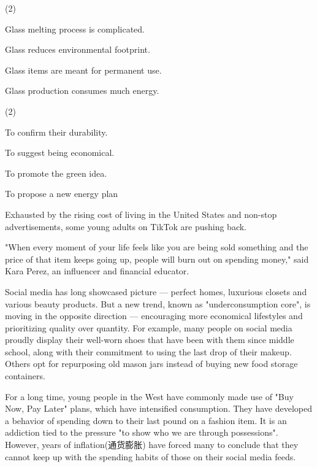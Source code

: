 \documentclass{英语试卷}
\begin{document}
\begin{choices}(2)
  \item Glass melting process is complicated.
  \item Glass reduces environmental footprint.
  \item Glass items are meant for permanent use.
  \item Glass production consumes much energy.
\end{choices}
\begin{choices}(2)
  \item To confirm their durability.
  \item To suggest being economical.
  \item To promote the green idea.
  \item To propose a new energy plan
\end{choices}
\par Exhausted by the rising cost of living in the United States and non-stop advertisements, some young adults on TikTok are pushing back.\par
\par "When every moment of your life feels like you are being sold something and the price of that item keeps going up, people will burn out on spending money," said Kara Perez, an influencer and financial educator.\par
\par Social media has long showcased picture — perfect homes, luxurious closets and various beauty products. But a new trend, known as "underconsumption core", is moving in the opposite direction — encouraging more economical lifestyles and prioritizing quality over quantity. For example, many people on social media proudly display their well-worn shoes that have been with them since middle school, along with their commitment to using the last drop of their makeup. Others opt for repurposing old mason jars instead of buying new food storage containers.\par
\par For a long time, young people in the West have commonly made use of "Buy Now, Pay Later" plans, which have intensified consumption. They have developed a behavior of spending down to their last pound on a fashion item. It is an addiction tied to the pressure "to show who we are through possessions". However, years of inflation(通货膨胀) have forced many to conclude that they cannot keep up with the spending habits of those on their social media feeds.\par
\end{document}
